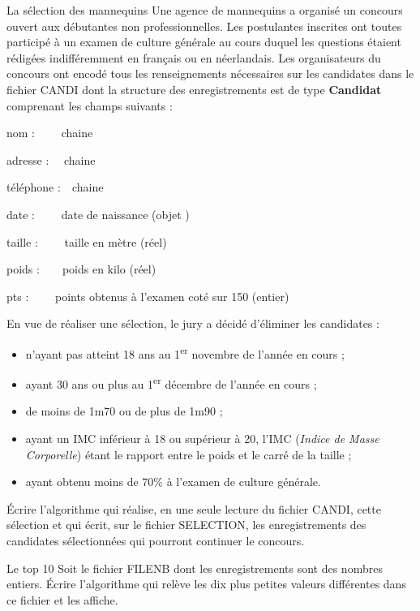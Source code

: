 \begin{Exercice}{La sélection des mannequins}
	Une agence de mannequins a organisé un concours ouvert aux débutantes
	non professionnelles. Les postulantes inscrites ont toutes participé à
	un examen de culture générale au cours duquel les questions étaient
	rédigées indifféremment en français ou en néerlandais. Les
	organisateurs du concours ont encodé tous les renseignements
	nécessaires sur les candidates dans le fichier CANDI dont la structure
	des enregistrements est de type \textbf{Candidat} comprenant les champs
	suivants :

	{ nom : \ \ \ \ chaine}

	{	adresse : \ \ chaine}

	{	téléphone :\ \ chaine}

	{	date : \ \ \ \ date de naissance
	(objet )}

	{	taille : \ \ \ \ taille en mètre (réel)}

	{	poids :\ \ \ \ poids en kilo (réel)}

	{	pts : \ \ \ \ points obtenus à l’examen coté sur 150 (entier)}

	
	En vue de réaliser une sélection, le jury a décidé d’éliminer les
	candidates :

	\liststyleListv
	\begin{itemize}
		\item 
			n’ayant pas atteint 18 ans au 1\textsuperscript{er} novembre de l’année
			en cours ;
		\item 
			ayant 30 ans ou plus au 1\textsuperscript{er} décembre de l’année en
			cours ;
		\item 
			de moins de 1m70 ou de plus de 1m90 ;
		\item 
			ayant un IMC inférieur à 18 ou supérieur à 20, l’IMC (\textit{Indice de
			Masse Corporelle}) étant le rapport entre le poids et le carré de la
			taille ;
		\item 
			ayant obtenu moins de 70\% à l’examen de culture générale.
	\end{itemize}
	
	Écrire l’algorithme qui réalise, en une seule lecture du fichier CANDI,
	cette sélection et qui écrit, sur le fichier SELECTION, les
	enregistrements des candidates sélectionnées qui pourront continuer le
	concours.
\end{Exercice}

\begin{Exercice}{Le top 10}
	Soit le fichier FILENB dont les enregistrements
	sont des nombres entiers. Écrire l’algorithme qui relève les dix plus
	petites valeurs différentes dans ce fichier et les affiche.
\end{Exercice}

